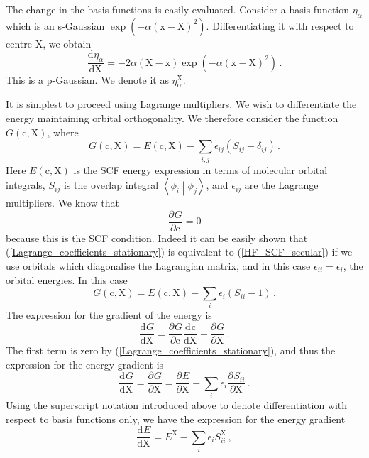 \documentclass{article}
\theoremstyle{plain}\theoremheaderfont{\normalfont\itshape}\theorembodyfont{\rmfamily}\theoremseparator{.}\newtheorem*{rem}{Remark}\newtheorem*{ex}{Example}\newtheorem*{proof}{Proof}\newtheorem*{altp}{Alternative proof}
\theoremstyle{plain}\theoremheaderfont{\normalfont\bfseries}\theorembodyfont{\rmfamily}\theoremseparator{.}\newtheorem{thm}{Theorem}[section]\newtheorem{lem}[thm]{Lemma}\newtheorem{prop}[thm]{Proposition}\newtheorem*{cor}{Corollary}\newtheorem{defn}[thm]{Definition}\newtheorem{clm}[thm]{Claim}\newtheorem{clminproof}{Claim}
\theoremstyle{break}\theoremheaderfont{\normalfont\itshape}\theorembodyfont{\rmfamily}\theoremseparator{.\medskip}\newtheorem*{proofskip}{Proof}\newtheorem*{exs}{Examples}\newtheorem*{rems}{Remarks}
\theoremstyle{break}\theoremheaderfont{\normalfont\bfseries}\theorembodyfont{\rmfamily}\theoremseparator{.\medskip}\newtheorem{lemskip}[thm]{Lemma}\newtheorem{defnskip}[thm]{Definition}\newtheorem{propskip}[thm]{Proposition}\newtheorem{thmskip}[thm]{Theorem}
\numberwithin{equation}{section}
\newcommand{\dv}[3][]{\frac{\mathrm{d}^{#1} #2}{{\mathrm{d} #3}^{#1}}}
\newcommand{\pdv}[3][]{\frac{\partial^{#1} #2}{{\partial #3}^{#1}}}
\newcommand{\braket}[2]{\left\langle #1 \middle| #2 \right\rangle}
\newcommand{\vb}[1]{\bm{\mathrm{#1}}}
\begin{document}
    The change in the basis functions is easily evaluated. Consider a basis function \(\eta_\alpha\) which is an s-Gaussian \(\exp(-\alpha(\vb{x}-\vb{X})^2)\). Differentiating it with respect to centre \(\vb{X}\), we obtain
    \begin{equation}
        \dv{\eta_\alpha}{\vb{X}}=-2\alpha(\vb{X}-\vb{x})\exp(-\alpha(\vb{x}-\vb{X})^2)\,.
    \end{equation}
    This is a p-Gaussian. We denote it as \(\eta_\alpha^{\vb{X}}\).

    It is simplest to proceed using Lagrange multipliers. We wish to differentiate the energy maintaining orbital orthogonality. We therefore consider the function \(G(\vb{c},\vb{X})\), where
    \begin{equation}
        G(\vb{c},\vb{X})=E(\vb{c},\vb{X})-\sum_{i,j}\epsilon_{ij}(S_{ij}-\delta_{ij})\,.
    \end{equation}
    Here \(E(\vb{c},\vb{X})\) is the SCF energy expression in terms of molecular orbital integrals, \(S_{ij}\) is the overlap integral \(\braket{\phi_i}{\phi_j}\), and \(\epsilon_{ij}\) are the Lagrange multipliers. We know that
    \begin{equation}\label{Lagrange_coefficients_stationary}
        \pdv{G}{\vb{c}}=0
    \end{equation}
    because this is the SCF condition. Indeed it can be easily shown that (\ref{Lagrange_coefficients_stationary}) is equivalent to (\ref{HF_SCF_secular}) if we use orbitals which diagonalise the Lagrangian matrix, and in this case \(\epsilon_{ii}=\epsilon_i\), the orbital energies. In this case
    \begin{equation}
        G(\vb{c},\vb{X})=E(\vb{c},\vb{X})-\sum_i\epsilon_i(S_{ii}-1)\,.
    \end{equation}
    The expression for the gradient of the energy is
    \begin{equation}
        \dv{G}{\vb{X}}=\pdv{G}{\vb{c}}\dv{\vb{c}}{\vb{X}}+\pdv{G}{\vb{X}}\,.
    \end{equation}
    The first term is zero by (\ref{Lagrange_coefficients_stationary}), and thus the expression for the energy gradient is
    \begin{equation}
        \dv{G}{\vb{X}}=\pdv{G}{\vb{X}}=\pdv{E}{\vb{X}}-\sum_i\epsilon_i\pdv{S_{ii}}{\vb{X}}\,.
    \end{equation}
    Using the superscript notation introduced above to denote differentiation with respect to basis functions only, we have the expression for the energy gradient
    \begin{equation}
        \dv{E}{\vb{X}}=E^{\vb{X}}-\sum_i\epsilon_i S_{ii}^{\vb{X}}\,,
    \end{equation}
\end{document}
